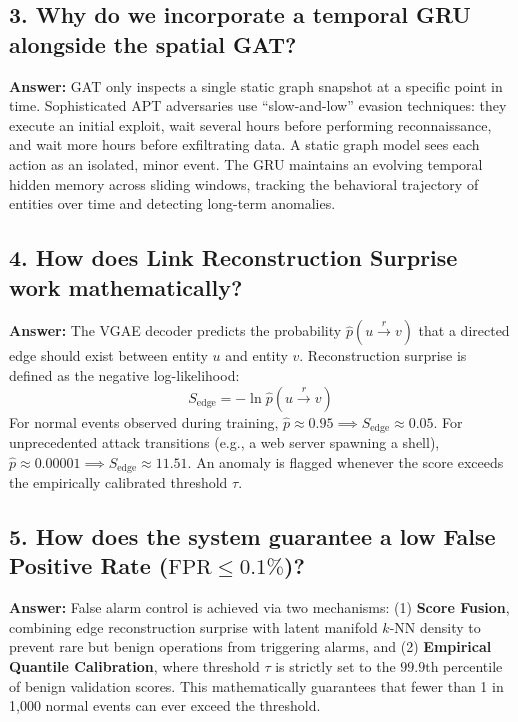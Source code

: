 \documentclass[11pt,a4paper]{report}
\begin{document}
\subsection{3. Why do we incorporate a temporal GRU alongside the spatial GAT?}
\textbf{Answer:} GAT only inspects a single static graph snapshot at a specific point in time. Sophisticated APT adversaries use ``slow-and-low'' evasion techniques: they execute an initial exploit, wait several hours before performing reconnaissance, and wait more hours before exfiltrating data. A static graph model sees each action as an isolated, minor event. The GRU maintains an evolving temporal hidden memory across sliding windows, tracking the behavioral trajectory of entities over time and detecting long-term anomalies.

\subsection{4. How does Link Reconstruction Surprise work mathematically?}
\textbf{Answer:} The VGAE decoder predicts the probability $\hat{p}(u \xrightarrow{r} v)$ that a directed edge should exist between entity $u$ and entity $v$. Reconstruction surprise is defined as the negative log-likelihood:
$$S_{\text{edge}} = -\ln \hat{p}(u \xrightarrow{r} v)$$
For normal events observed during training, $\hat{p} \approx 0.95 \implies S_{\text{edge}} \approx 0.05$. For unprecedented attack transitions (e.g., a web server spawning a shell), $\hat{p} \approx 0.00001 \implies S_{\text{edge}} \approx 11.51$. An anomaly is flagged whenever the score exceeds the empirically calibrated threshold $\tau$.

\subsection{5. How does the system guarantee a low False Positive Rate \texorpdfstring{($\text{FPR} \le 0.1\%$)}{(FPR <= 0.1\%)}?}
\textbf{Answer:} False alarm control is achieved via two mechanisms: (1) \textbf{Score Fusion}, combining edge reconstruction surprise with latent manifold $k$-NN density to prevent rare but benign operations from triggering alarms, and (2) \textbf{Empirical Quantile Calibration}, where threshold $\tau$ is strictly set to the $99.9\text{th}$ percentile of benign validation scores. This mathematically guarantees that fewer than 1 in 1,000 normal events can ever exceed the threshold.
\end{document}

